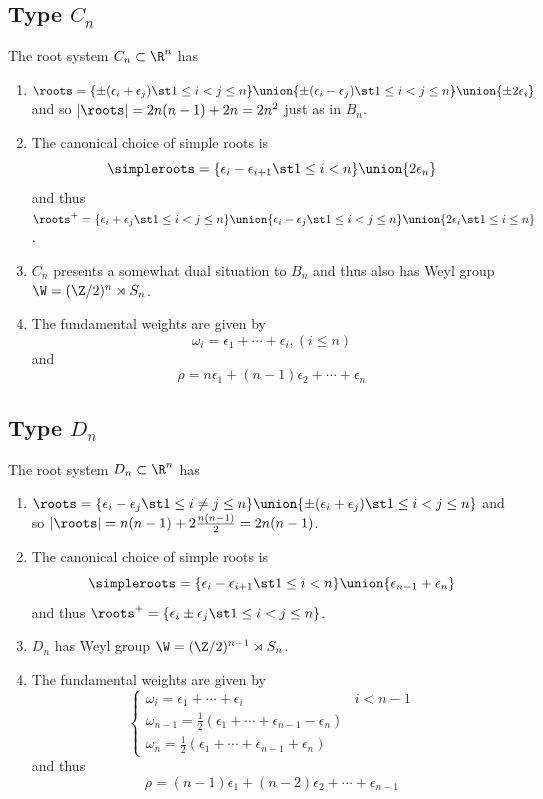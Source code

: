 \documentclass[11pt,leqno,oneside]{amsart}
\numberwithin{thm}{section}
\newcommand{\halfsum}{\rho}
\renewcommand{\Sym}{S}
\begin{document}
\subsection{Type \(C_n\)}
\begin{prop}
  The root system \(C_n \subset \R^n\) has
  \begin{enumerate}
  \item \(\roots = \{\pm(\epsilon_i+\epsilon_j) \st 1 \leq i < j \leq
    n\} \union \{\pm(\epsilon_i - \epsilon_j) \st 1 \leq i < j
    \leq n\} \union \{\pm 2 \epsilon_i\}\) and so \(|\roots| =
    2n(n-1)+2n = 2n^2\) just as in \(B_n\).
  \item The canonical choice of simple roots is \[
      \simpleroots = \{\epsilon_i - \epsilon_{i+1} \st 1 \leq i < n\}
      \union \{2 \epsilon_n\}
    \]
    and thus \(\roots^+ = \{\epsilon_i+\epsilon_j \st 1 \leq i < j
    \leq n\} \union \{\epsilon_i-\epsilon_j \st 1 \leq i < j
    \leq n\} \union \{2 \epsilon_i \st 1 \leq i \leq n\}\).
  \item \(C_n\) presents a somewhat dual situation to \(B_n\) and thus
    also has Weyl group \(\W = (\Z/2)^n \rtimes \Sym_n\).
  \item The fundamental weights are given by \[
      \omega_i = \epsilon_1 + \cdots + \epsilon_i, (i \leq n)
    \]
    and \[
      \halfsum = n \epsilon_1 + (n-1) \epsilon_2 + \cdots + \epsilon_n
    \]
  \end{enumerate}
\end{prop}
\subsection{Type \(D_n\)}
\begin{prop}
  The root system \(D_n \subset \R^n\) has
  \begin{enumerate}
  \item \(\roots = \{\epsilon_i - \epsilon_j \st 1 \leq i \neq j
    \leq n\} \union \{\pm(\epsilon_i + \epsilon_j) \st 1 \leq i < j
    \leq n\}\) and so \(|\roots| = n(n-1)+2\frac{n(n-1)}{2} =
    2n(n-1)\).
  \item The canonical choice of simple roots is \[
      \simpleroots = \{\epsilon_i - \epsilon_{i+1} \st 1 \leq i < n\}
      \union \{\epsilon_{n-1}+\epsilon_{n}\}
    \]
    and thus \(\roots^+ = \{\epsilon_i \pm \epsilon_j \st 1 \leq i < j
    \leq n\}\).
  \item \(D_n\) has Weyl group \(\W = (\Z/2)^{n-1} \rtimes \Sym_n\).
  \item The fundamental weights are given by \[
      \begin{cases}
        \omega_i = \epsilon_1 + \cdots + \epsilon_i & i < n-1\\
        \omega_{n-1} = \frac{1}{2}(\epsilon_1 + \cdots +
        \epsilon_{n-1} - \epsilon_n) \\
        \omega_n = \frac{1}{2}(\epsilon_1 + \cdots +
        \epsilon_{n-1}+\epsilon_n) 
      \end{cases}
    \]
    and thus \[
      \halfsum = (n-1) \epsilon_1 + (n-2) \epsilon_2 + \cdots +
      \epsilon_{n-1} 
    \]
  \end{enumerate}

\end{prop}
\end{document}
